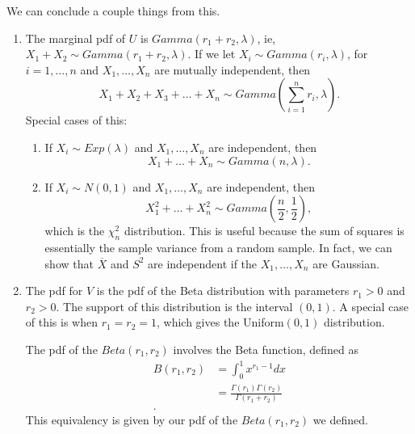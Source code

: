 We can conclude a couple things from this.
\begin{enumerate}
	\item The marginal pdf of $U$ is $Gamma\left( r_1 + r_2, \lambda \right) $, ie, $X_1 + X_2 \sim Gamma\left( r_1 + r_2, \lambda \right) $. If we let $X_i \sim Gamma\left( r_i , \lambda \right) $, for $i = 1, \ldots, n $ and $X_{1} , \ldots , X_{n}$ are mutually independent, then 
		\[
			X_1 + X_2 + X_3 + \ldots + X_{n} \sim Gamma\left( \sum_{i=1}^{n} r_{i}, \lambda \right) 
		.\]
		Special cases of this:
		\begin{enumerate}
			\item If $X_{i} \sim Exp\left( \lambda \right) $ and $X_{1} , \ldots , X_{n}$ are independent, then 
				\[
					X_1 + \ldots + X_{n} \sim Gamma\left( n, \lambda \right) 
				.\] 
			\item If $X_{i}\sim N\left( 0, 1 \right) $ and $X_{1} , \ldots , X_{n}$ are independent, then
				\[
					X_1 ^{2} + \ldots + X_{n}^{2} \sim Gamma\left( \frac{n}{2}, \frac{1}{2} \right) 
				,\] 
				which is the $\chi ^{2}_{n}$ distribution. This is useful because the sum of squares is essentially the sample variance from a random sample. In fact, we can show that $\overline{X}$ and $S^2$ are independent if the $X_{1} , \ldots , X_{n}$ are Gaussian.
		\end{enumerate}
	\item The pdf for $V$ is the pdf of the Beta distribution with parameters $r_1 > 0$ and $r_2 > 0$. The support of this distribution is the interval $\left( 0,1 \right) $. A special case of this is when $r_1 = r_2 = 1$, which gives the Uniform$\left( 0, 1 \right)$ distribution.

		The pdf of the $Beta\left( r_1, r_2 \right) $ involves the Beta function, defined as
		\begin{align*}
			B\left( r_1, r_2 \right) &= \int_{0}^{1} x^{r_1 - 1}dx \\
						 &= \frac{\Gamma\left( r_1 \right) \Gamma\left( r_2 \right) }{\Gamma\left( r_1 + r_2 \right) } \\
		.\end{align*}
		This equivalency is given by our pdf of the $Beta\left( r_1, r_2 \right) $ we defined.
\end{enumerate}

